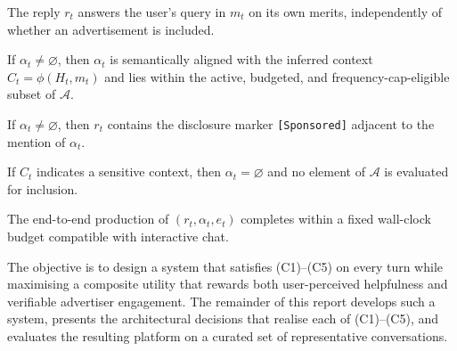 \begin{description}[leftmargin=2.2em,style=nextline]
    \item[(C1) Helpfulness.] The reply $r_t$ answers the user's query in $m_t$
        on its own merits, independently of whether an advertisement is
        included.
    \item[(C2) Relevance-conditional injection.] If $\alpha_t \neq \varnothing$,
        then $\alpha_t$ is semantically aligned with the inferred context
        $C_t = \phi(H_t, m_t)$ and lies within the active, budgeted, and
        frequency-cap-eligible subset of $\mathcal{A}$.
    \item[(C3) Mandatory disclosure.] If $\alpha_t \neq \varnothing$, then
        $r_t$ contains the disclosure marker \texttt{[Sponsored]} adjacent to
        the mention of $\alpha_t$.
    \item[(C4) Sensitivity gating.] If $C_t$ indicates a sensitive context,
        then $\alpha_t = \varnothing$ and no element of $\mathcal{A}$ is
        evaluated for inclusion.
    \item[(C5) Latency.] The end-to-end production of $(r_t, \alpha_t, e_t)$
        completes within a fixed wall-clock budget compatible with interactive
        chat.
\end{description}

The objective is to design a system that satisfies (C1)--(C5) on every turn
while maximising a composite utility that rewards both user-perceived
helpfulness and verifiable advertiser engagement. The remainder of this report
develops such a system, presents the architectural decisions that realise each
of (C1)--(C5), and evaluates the resulting platform on a curated set of
representative conversations.